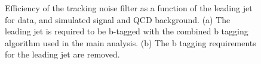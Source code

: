 \begin{figure}[!htb]
\centering
{}
\caption{Efficiency of the tracking noise filter as a function of the leading jet \pt for data, and simulated signal and QCD background.
(a) The leading jet is required to be b-tagged with the combined b tagging algorithm used in the main analysis. (b) The b tagging requirements for the leading jet are removed.}
\label{fig:eff-filters-eta}
\end{figure}


